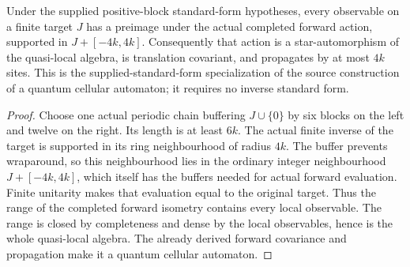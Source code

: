 \begin{lemma}
    \label{lem:mpu_supplied_standard_form_actual_qca}
    \leanok
    Under the supplied positive-block standard-form hypotheses, every
    observable on a finite target $J$ has a preimage under the actual
    completed forward action, supported in $J+[-4k,4k]$. Consequently
    that action is a star-automorphism of the quasi-local algebra,
    is translation covariant, and propagates by at most $4k$ sites.
    This is the supplied-standard-form specialization of the
    source construction of a quantum cellular automaton; it requires
    no inverse standard form.
\end{lemma}
\begin{proof}\leanok
    Choose one actual periodic chain buffering $J\cup\{0\}$ by six
    blocks on the left and twelve on the right. Its length is at
    least $6k$. The actual finite inverse of the target is supported
    in its ring neighbourhood of radius $4k$. The buffer prevents
    wraparound, so this neighbourhood lies in the ordinary integer
    neighbourhood $J+[-4k,4k]$, which itself has the buffers needed
    for actual forward evaluation. Finite unitarity makes that
    evaluation equal to the original target. Thus the range of the
    completed forward isometry contains every local observable.
    The range is closed by completeness and dense by the local
    observables, hence is the whole quasi-local algebra. The already
    derived forward covariance and propagation make it a quantum
    cellular automaton.
\end{proof}
